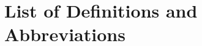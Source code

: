 \documentclass[../../../../testPlan.tex]{subfiles}
\begin{document}
	\section{List of Definitions and Abbreviations}
\end{document}
